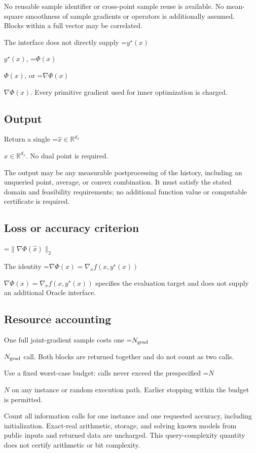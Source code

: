 \documentclass[10pt,a4paper]{article}
\newcommand{\AtlasMath}[1]{\par\begingroup\centering\setbox0=\hbox{$\displaystyle #1$}\ifdim\wd0>1.4\linewidth\typeout{ATLAS WIDE FORMULA: \the\wd0}\fi\ifdim\wd0>\linewidth\resizebox{\linewidth}{!}{\box0}\else\box0\fi\par\endgroup}
\newcommand{\AtlasInlineMath}[1]{\begingroup\setbox0=\hbox{$#1$}\ifdim\wd0>.4\linewidth\endgroup\AtlasMath{#1}\else\endgroup$#1$\fi}
\begin{document}
No reusable sample identifier or cross-point sample reuse is available. No mean-square smoothness of sample gradients or operators is additionally assumed. Blocks within a full vector may be correlated.

The interface does not directly supply \AtlasInlineMath{y^\star(x)}, \AtlasInlineMath{\Phi(x)}, or \AtlasInlineMath{\nabla\Phi(x)}. Every primitive gradient used for inner optimization is charged.

\subsection{Output}
Return a single \AtlasInlineMath{\widehat x\in\mathbb R^{d_x}}. No dual point is required.

The output may be any measurable postprocessing of the history, including an unqueried point, average, or convex combination. It must satisfy the stated domain and feasibility requirements; no additional function value or computable certificate is required.

\subsection{Loss or accuracy criterion}

\AtlasMath{\|\nabla\Phi(\widehat{x})\|_2}


The identity \AtlasInlineMath{\nabla\Phi(x)=\nabla_xf(x,y^\star(x))} specifies the evaluation target and does not supply an additional Oracle interface.

\subsection{Resource accounting}
One full joint-gradient sample costs one \AtlasInlineMath{N_{\rm grad}} call. Both blocks are returned together and do not count as two calls.

Use a fixed worst-case budget: calls never exceed the prespecified \AtlasInlineMath{N} on any instance or random execution path. Earlier stopping within the budget is permitted.

Count all information calls for one instance and one requested accuracy, including initialization. Exact-real arithmetic, storage, and solving known models from public inputs and returned data are uncharged. This query-complexity quantity does not certify arithmetic or bit complexity.
\end{document}
